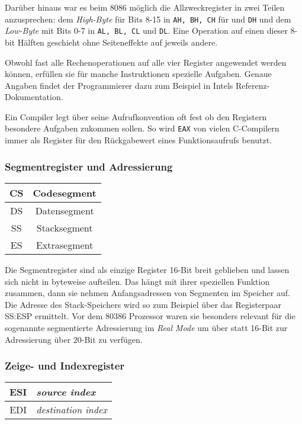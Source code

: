 Darüber hinaus war es beim 8086 möglich die Allzweckregister in zwei Teilen anzusprechen: dem \emph{High-Byte} für Bits 8-15 in {\tt AH, BH, CH} für  und {\tt DH} und dem \emph{Low-Byte} mit Bits 0-7 in {\tt AL, BL, CL} und {\tt DL}. Eine Operation auf einen dieser 8-bit Hälften geschieht ohne Seiteneffekte auf jeweils andere.

Obwohl fast alle Rechenoperationen auf alle vier Register angewendet werden können, erfüllen sie für manche Instruktionen spezielle Aufgaben. Genaue Angaben findet der Programmierer dazu zum Beispiel in Intels Referenz-Dokumentation. \cite{intelreferenz}

Ein Compiler legt über seine Aufrufkonvention oft fest ob den Registern besondere Aufgaben zukommen sollen. So wird {\tt EAX} von vielen C-Compilern immer als Register für den Rückgabewert eines Funktionsaufrufs benutzt. \cite{wp:callconv}

\subsubsection{Segmentregister und Adressierung}

\begin{tabular}{|c|c|}
\hline CS & Codesegment \\
\hline DS & Datensegment \\
\hline SS & Stacksegment \\
\hline ES & Extrasegment\\
\hline
\end{tabular}

Die Segmentregister sind als einzige Register 16-Bit breit geblieben und lassen sich nicht in byteweise aufteilen. Das hängt mit ihrer speziellen Funktion zusammen, dann sie nehmen Anfangsadressen von Segmenten im Speicher auf. Die Adresse des Stack-Speichers wird so zum Beispiel über das Registerpaar SS:ESP ermittelt. Vor dem 80386 Prozessor waren sie besonders relevant für die sogenannte segmentierte Adressierung im \emph{Real Mode} um über statt 16-Bit zur Adressierung über 20-Bit zu verfügen.


\subsubsection{Zeige- und Indexregister}

\begin{tabular}{|c|l|}
\hline ESI & \emph{source index} \\
\hline EDI & \emph{destination index} \\
\hline
\end{tabular}

